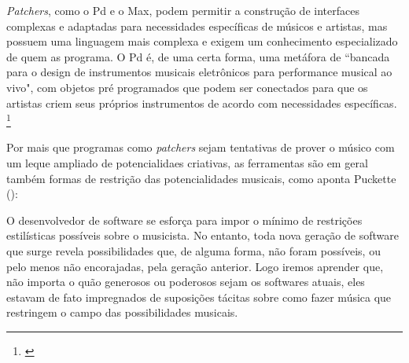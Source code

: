\emph{Patchers}, como o Pd e o Max, podem permitir a construção de interfaces complexas e adaptadas para necessidades específicas de músicos e artistas, mas possuem uma linguagem mais complexa e exigem um conhecimento especializado de quem as programa. O Pd é, de uma certa forma, uma metáfora de ``bancada para o design de instrumentos musicais eletrônicos para performance musical ao vivo", com objetos pré programados que podem ser conectados para que os artistas criem seus próprios instrumentos de acordo com necessidades específicas. \footnote{\cite{PucketteMiller}}
 
Por mais que programas como \emph{patchers} sejam tentativas de prover o músico com um leque ampliado de potencialidaes criativas, as ferramentas  são em geral também formas de restrição das potencialidades musicais, como aponta Puckette (\citeyear{PucketteMiller}):

\begin{citacao}
 O desenvolvedor de software se esforça para impor o mínimo de restrições estilísticas possíveis sobre o musicista. No entanto, toda nova geração de software que surge revela possibilidades que, de alguma forma, não foram possíveis, ou pelo menos não encorajadas, pela geração anterior. Logo iremos aprender que, não importa o quão generosos ou poderosos sejam os softwares atuais, eles estavam de fato impregnados de suposições tácitas sobre como fazer música que restringem o campo das possibilidades musicais.

\end{citacao}


